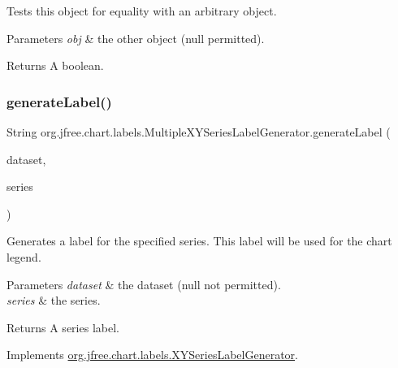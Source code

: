 Tests this object for equality with an arbitrary object.


\begin{DoxyParams}{Parameters}
{\em obj} & the other object ({\ttfamily null} permitted).\\
\hline
\end{DoxyParams}
\begin{DoxyReturn}{Returns}
A boolean. 
\end{DoxyReturn}
\mbox{\label{classorg_1_1jfree_1_1chart_1_1labels_1_1_multiple_x_y_series_label_generator_a47ff6008d9b39786f639149605081f0f}} 
\subsubsection{\texorpdfstring{generate\+Label()}{generateLabel()}}
{\footnotesize\ttfamily String org.\+jfree.\+chart.\+labels.\+Multiple\+X\+Y\+Series\+Label\+Generator.\+generate\+Label (\begin{DoxyParamCaption}\item[{\mbox{\hyperlink{interfaceorg_1_1jfree_1_1data_1_1xy_1_1_x_y_dataset}{X\+Y\+Dataset}}}]{dataset,  }\item[{int}]{series }\end{DoxyParamCaption})}

Generates a label for the specified series. This label will be used for the chart legend.


\begin{DoxyParams}{Parameters}
{\em dataset} & the dataset ({\ttfamily null} not permitted). \\
\hline
{\em series} & the series.\\
\hline
\end{DoxyParams}
\begin{DoxyReturn}{Returns}
A series label. 
\end{DoxyReturn}


Implements \mbox{\hyperlink{interfaceorg_1_1jfree_1_1chart_1_1labels_1_1_x_y_series_label_generator_a03bdf2e5c8623657a8f6abc8f467d5b1}{org.\+jfree.\+chart.\+labels.\+X\+Y\+Series\+Label\+Generator}}.

